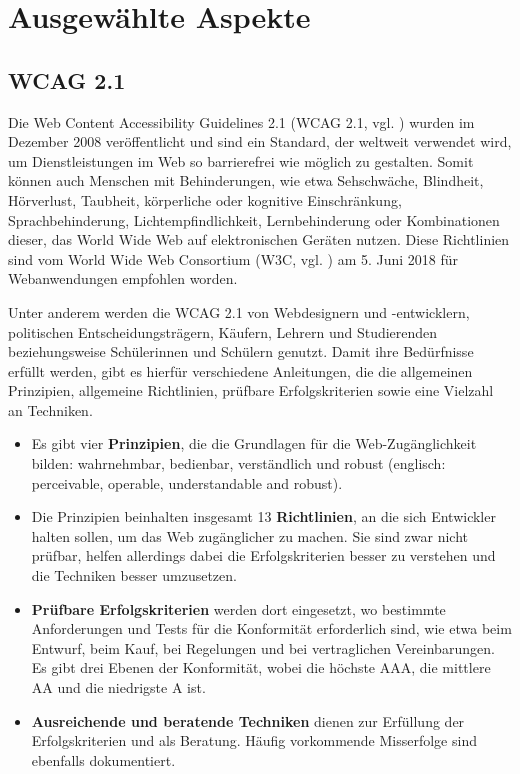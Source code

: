 \chapter{Ausgewählte Aspekte}
\section{WCAG 2.1}
Die Web Content Accessibility Guidelines 2.1 (WCAG 2.1, vgl. \cite{wcag_2_1_2018}) wurden im Dezember 2008 veröffentlicht und sind ein Standard, der weltweit verwendet wird, um Dienstleistungen im Web so barrierefrei wie möglich zu gestalten. Somit können auch Menschen mit Behinderungen, wie etwa Sehschwäche, Blindheit, Hörverlust, Taubheit, körperliche oder kognitive Einschränkung, Sprachbehinderung, Lichtempfindlichkeit, Lernbehinderung oder Kombinationen dieser, das World Wide Web auf elektronischen Geräten nutzen. Diese Richtlinien sind vom World Wide Web Consortium (W3C, vgl. \cite{w3c_1994}) am 5. Juni 2018 für Webanwendungen empfohlen worden.

Unter anderem werden die WCAG 2.1 von Webdesignern und -entwicklern, politischen Entscheidungsträgern, Käufern, Lehrern und Studierenden beziehungsweise Schülerinnen und Schülern genutzt. Damit ihre Bedürfnisse erfüllt werden, gibt es hierfür verschiedene Anleitungen, die die allgemeinen Prinzipien, allgemeine Richtlinien, prüfbare Erfolgskriterien sowie eine Vielzahl an Techniken. 

\begin{itemize}
	\item Es gibt vier \textbf{Prinzipien}, die die Grundlagen für die Web-Zugänglichkeit bilden: wahrnehmbar, bedienbar, verständlich und robust (englisch: perceivable, operable, understandable and robust).
	\item Die Prinzipien beinhalten insgesamt 13 \textbf{Richtlinien}, an die sich Entwickler halten sollen, um das Web zugänglicher zu machen. Sie sind zwar nicht prüfbar, helfen allerdings dabei die Erfolgskriterien besser zu verstehen und die Techniken besser umzusetzen.
	\item \textbf{Prüfbare Erfolgskriterien} werden dort eingesetzt, wo bestimmte Anforderungen und Tests für die Konformität erforderlich sind, wie etwa beim Entwurf, beim Kauf, bei Regelungen und bei vertraglichen Vereinbarungen. Es gibt drei Ebenen der Konformität, wobei die höchste AAA, die mittlere AA und die niedrigste A ist.
	\item \textbf{Ausreichende und beratende Techniken} dienen zur Erfüllung der Erfolgskriterien und als Beratung. Häufig vorkommende Misserfolge sind ebenfalls dokumentiert.
\end{itemize}

